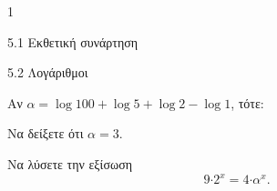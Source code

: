 \begin{ylh}{1}
\item 5.1 Εκθετική συνάρτηση
\item 5.2 Λογάριθμοι
\end{ylh}
Αν $\alpha = \log 100 + \log 5 + \log 2 - \log 1$, τότε:
\begin{alist}
\item Να δείξετε ότι $\alpha = 3$.
\item Να λύσετε την εξίσωση
\begin{equation*}9{\cdot 2}^{x} = 4{\cdot \alpha}^{x}.\end{equation*}
\end{alist}

